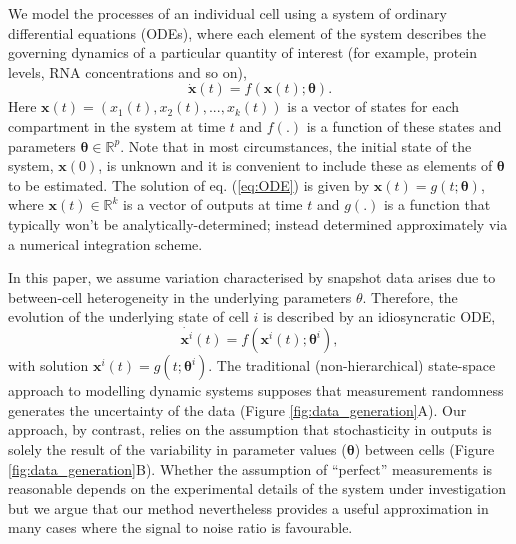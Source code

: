 \documentclass[10pt,letterpaper]{article}
\begin{document}
We model the processes of an individual cell using a system of ordinary differential equations (ODEs), where each element of the system describes the governing dynamics of a particular quantity of interest (for example, protein levels, RNA concentrations and so on),
%
\begin{equation}\label{eq:ODE}
\dot{\boldsymbol{x}}(t) = f(\boldsymbol{x}(t); \boldsymbol{\theta}).
\end{equation}
%
Here $\boldsymbol{x}(t) = (x_1(t), x_2(t), ..., x_k(t))$ is a vector of states for each compartment in the system at time $t$ and $f(.)$ is a function of these states and parameters $\boldsymbol{\theta}\in\mathbb{R}^p$. Note that in most circumstances, the initial state of the system, $\boldsymbol{x}(0)$, is unknown and it is convenient to include these as elements of $\boldsymbol{\theta}$ to be estimated. The solution of eq. (\ref{eq:ODE}) is given by $\boldsymbol{x}(t) = g(t; \boldsymbol{\theta})$, where $\boldsymbol{x}(t)\in\mathbb{R}^k$ is a vector of outputs at time $t$ and $g(.)$ is a function that typically won't be analytically-determined; instead determined approximately via a numerical integration scheme. 

In this paper, we assume variation characterised by snapshot data arises due to between-cell heterogeneity in the underlying parameters $\theta$. Therefore, the evolution of the underlying state of cell $i$ is described by an idiosyncratic ODE,
%
\begin{equation}
\dot{\boldsymbol{x}^i}(t) = f(\boldsymbol{x}^i(t); \boldsymbol{\theta}^i),
\end{equation}
%
with solution $\boldsymbol{x}^i(t) = g(t; \boldsymbol{\theta}^i)$. The traditional (non-hierarchical) state-space approach to modelling dynamic systems supposes that measurement randomness generates the uncertainty of the data (Figure \ref{fig:data_generation}A). Our approach, by contrast, relies on the assumption that stochasticity in outputs is solely the result of the variability in parameter values ($\boldsymbol{\theta}$) between cells (Figure \ref{fig:data_generation}B). Whether the assumption of ``perfect'' measurements is reasonable depends on the experimental details of  the system under investigation but we argue that our method nevertheless provides a useful approximation in many cases where the signal to noise ratio is favourable. 
\end{document}
